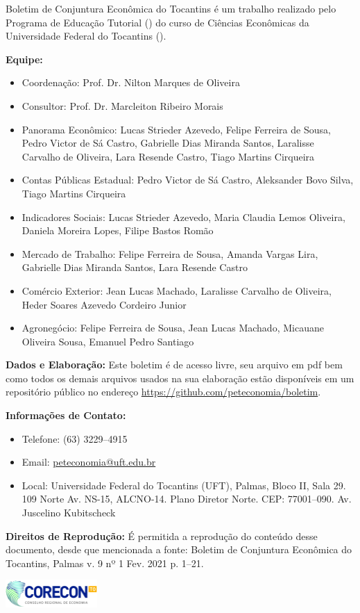 \begin{tcolorbox}[colback=boxbackground, colframe=boxbackground, arc=0mm, top=15pt]
Boletim de Conjuntura Econômica do Tocantins é um trabalho realizado pelo Programa de Educação Tutorial () do curso de Ciências Econômicas da Universidade Federal do Tocantins ().
\\
\par{\bf Equipe:}
\begin{itemize}
	\item{Coordenação:} Prof. Dr. Nilton Marques de Oliveira
	\item{Consultor:} Prof. Dr. Marcleiton Ribeiro Morais
	\item{Panorama Econômico:} Lucas Strieder Azevedo, Felipe Ferreira de Sousa, Pedro Victor de Sá Castro, Gabrielle Dias Miranda Santos, Laralisse Carvalho de Oliveira, Lara Resende Castro, Tiago Martins Cirqueira
	\item{Contas Públicas Estadual:} Pedro Victor de Sá Castro, Aleksander Bovo Silva, Tiago Martins Cirqueira
	\item{Indicadores Sociais:} Lucas Strieder Azevedo, Maria Claudia Lemos Oliveira, Daniela Moreira Lopes, Filipe Bastos Romão
	\item{Mercado de Trabalho:} Felipe Ferreira de Sousa, Amanda Vargas Lira, Gabrielle Dias Miranda Santos, Lara Resende Castro
	\item{Comércio Exterior:} Jean Lucas Machado,  Laralisse Carvalho de Oliveira, Heder Soares Azevedo Cordeiro Junior
	\item{Agronegócio:} Felipe Ferreira de Sousa, Jean Lucas Machado, Micauane Oliveira Sousa, Emanuel Pedro Santiago
\end{itemize}
\par{\bf Dados e Elaboração:}
	Este boletim é de acesso livre, seu arquivo em pdf bem como todos os demais arquivos usados na sua elaboração estão disponíveis em um repositório público no endereço \href{https://github.com/peteconomia/boletim}{https://github.com/peteconomia/boletim}.
\\
\par{\bf Informações de Contato:}
\begin{itemize}
	\item{Telefone:} (63) 3229--4915
	\item{Email:} \href{mailto:peteconomia@uft.edu.br}{peteconomia@uft.edu.br}
	\item{Local:} Universidade Federal do Tocantins (UFT), Palmas, Bloco II, Sala 29. 109 Norte Av. NS-15, ALCNO-14. Plano Diretor Norte. CEP: 77001--090. Av. Juscelino Kubitscheck
\end{itemize}
\par{\bf Direitos de Reprodução:}
É permitida a reprodução do conteúdo desse documento, desde que mencionada a fonte: Boletim de Conjuntura Econômica do Tocantins, Palmas v. 9 nº 1 Fev. 2021 p. 1--21.
\end{tcolorbox}
\vspace{\fill}
\begin{center}
	\includegraphics[width=3.5cm]{logos/corecon.png}
\end{center}